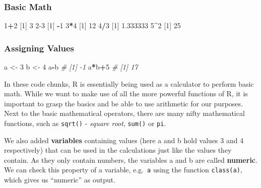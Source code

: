\documentclass[
]{book}
\newenvironment{Shaded}{\begin{snugshade}}{\end{snugshade}}
\newcommand{\CommentTok}[1]{\textcolor[rgb]{0.56,0.35,0.01}{\textit{#1}}}
\newcommand{\DecValTok}[1]{\textcolor[rgb]{0.00,0.00,0.81}{#1}}
\newcommand{\FloatTok}[1]{\textcolor[rgb]{0.00,0.00,0.81}{#1}}
\newcommand{\NormalTok}[1]{#1}
\newcommand{\OtherTok}[1]{\textcolor[rgb]{0.56,0.35,0.01}{#1}}
\newcommand{\SpecialCharTok}[1]{\textcolor[rgb]{0.81,0.36,0.00}{\textbf{#1}}}
\begin{document}
\subsubsection*{Basic Math}\label{basic-math}

\begin{Shaded}
\begin{Highlighting}[]
\DecValTok{1}\SpecialCharTok{+}\DecValTok{2} 
\NormalTok{  [}\DecValTok{1}\NormalTok{] }\DecValTok{3}
\DecValTok{2{-}3}
\NormalTok{  [}\DecValTok{1}\NormalTok{] }\SpecialCharTok{{-}}\DecValTok{1}
\DecValTok{3}\SpecialCharTok{*}\DecValTok{4}
\NormalTok{  [}\DecValTok{1}\NormalTok{] }\DecValTok{12}
\DecValTok{4}\SpecialCharTok{/}\DecValTok{3}
\NormalTok{  [}\DecValTok{1}\NormalTok{] }\FloatTok{1.333333}
\DecValTok{5}\SpecialCharTok{\^{}}\DecValTok{2}
\NormalTok{  [}\DecValTok{1}\NormalTok{] }\DecValTok{25}
\end{Highlighting}
\end{Shaded}

\subsubsection*{Assigning Values}\label{assigning-values}

\begin{Shaded}
\begin{Highlighting}[]
\NormalTok{a }\OtherTok{\textless{}{-}} \DecValTok{3}
\NormalTok{b }\OtherTok{\textless{}{-}} \DecValTok{4}
\NormalTok{a}\SpecialCharTok{{-}}\NormalTok{b}
\CommentTok{\# [1] {-}1}
\NormalTok{a}\SpecialCharTok{*}\NormalTok{b}\SpecialCharTok{+}\DecValTok{5}
\CommentTok{\# [1] 17}
\end{Highlighting}
\end{Shaded}

In these code chunks, R is essentially being used as a calculator to perform basic math.
While we want to make use of all the more powerful functions of R, it is important to grasp the basics and be able to use arithmetic for our purposes.
Next to the basic mathematical operators, there are many nifty mathematical functions, such as \texttt{sqrt()} - \emph{square root}, \texttt{sum()} or \texttt{pi}.

We also added \textbf{variables} containing values (here a and b hold values 3 and 4 respectively) that can be used in the calculations just like the values they contain.
As they only contain numbers, the variables a and b are called \textbf{numeric}.
We can check this property of a variable, e.g.~\texttt{a} using the function \texttt{class(a)}, which gives us ``numeric'' as output.
\end{document}

